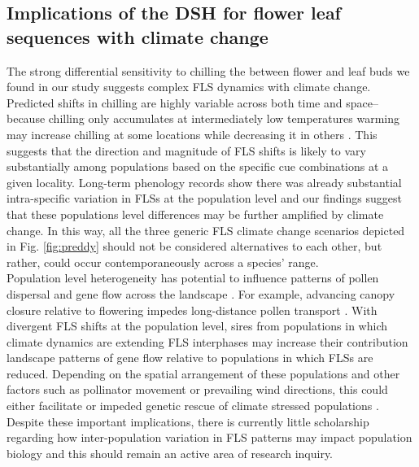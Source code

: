 \documentclass[11pt]{article}
\begin{document}
\subsection*{Implications of the DSH for flower leaf sequences with climate change}
\noindent The strong differential sensitivity to chilling the between flower and leaf buds we found in our study suggests complex FLS dynamics with climate change. Predicted shifts in chilling are highly variable across both time and space-- because chilling only accumulates at intermediately low temperatures warming may increase chilling at some locations while decreasing it in others \citep{Ettinger2020}. This suggests that the direction and magnitude of FLS shifts is likely to vary substantially among populations based on the specific cue combinations at a given locality. Long-term phenology records show there was already substantial intra-specific variation in FLSs at the population level \citep{Buonaiuto2020} and our findings suggest that these populations level differences may be further amplified by climate change. In this way, all the three generic FLS climate change scenarios depicted in Fig. \ref{fig:preddy} should not be considered alternatives to each other, but rather, could occur contemporaneously across a species' range. \\

\noindent Population level heterogeneity has potential to influence patterns of pollen dispersal and gene flow across the landscape \citep{Borycka2017,Pace:2018aa}. For example, advancing canopy closure relative to flowering impedes long-distance pollen transport \citep{Mileron2012}. With divergent FLS shifts at the population level, sires from populations in which climate dynamics are extending FLS interphases may increase their contribution landscape patterns of gene flow relative to populations in which FLSs are reduced. Depending on the spatial arrangement of these populations and other factors such as pollinator movement or prevailing wind directions, this could either facilitate or impeded genetic rescue of climate stressed populations \citep{Kling:2020aa}. Despite these important implications, there is currently little scholarship regarding how inter-population variation in FLS patterns may impact population biology and this should remain an active area of research inquiry.\\
\end{document}
